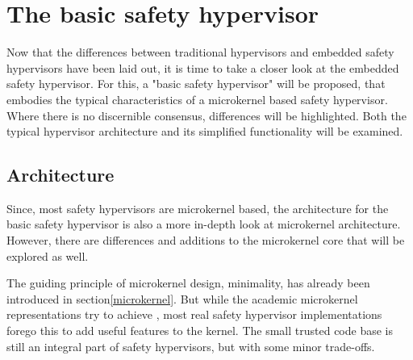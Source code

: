 
\chapter{The basic safety hypervisor} %

\label{Chapter2} %





Now that the differences between traditional hypervisors and embedded safety hypervisors have been laid out, it is time to take a closer look at the embedded safety hypervisor.
For this, a "basic safety hypervisor" will be proposed, that embodies the typical characteristics of a microkernel based safety hypervisor. Where there is no discernible consensus, differences will be highlighted. Both the typical hypervisor architecture and its simplified functionality will be examined.

\section{Architecture}
Since, most safety hypervisors are microkernel based, the architecture for the basic safety hypervisor is also a more in-depth look at microkernel architecture. However, there are differences and additions to the microkernel core that will be explored as well.   

The guiding principle of microkernel design, minimality, has already been introduced in section\ref{microkernel}. But while the academic microkernel representations try to achieve , most real safety hypervisor implementations forego this to add useful features to the kernel. The small trusted code base is still an integral part of safety hypervisors, but with some minor trade-offs. 


